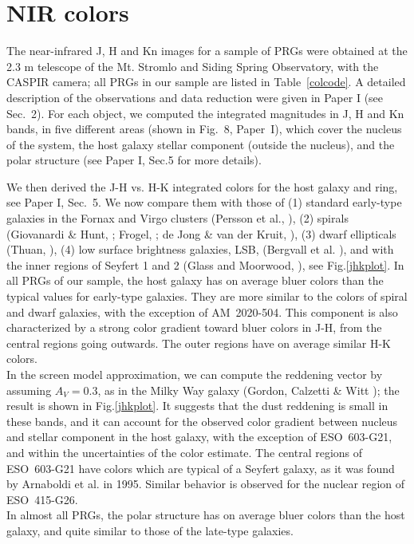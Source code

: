 \documentclass{aa}
\begin{document}
\section{NIR colors}\label{nircol}
The near-infrared J, H and Kn images for a sample of PRGs were obtained at
the 2.3 m telescope of the Mt. Stromlo and Siding Spring Observatory, with
the CASPIR camera; all PRGs in our sample are listed in Table~\ref{colcode}.
A detailed description of the observations and data reduction were given
in Paper I (see Sec.~2). For each object, we computed the
integrated magnitudes in J, H and Kn bands, in five different areas 
(shown in Fig.~8, Paper~I), which cover the nucleus of the system, 
the host galaxy stellar component (outside the nucleus), and the polar 
structure (see Paper I, Sec.5 for more details). 

We then derived the J-H vs. H-K integrated colors 
for the host galaxy and ring, see Paper I, Sec.~5.
We now compare them with those of (1) standard early-type galaxies in the
Fornax and Virgo clusters (Persson et al., \cite{Persson79}), (2) spirals
(Giovanardi \& Hunt, \cite{Giov96};
Frogel, \cite{Frog85}; de Jong \& van der Kruit, \cite{deJong94}), 
(3) dwarf ellipticals (Thuan, \cite{Thuan85}), (4) low surface brightness  
galaxies, LSB, (Bergvall et al. \cite{Berg99}), and with the inner regions
of Seyfert 1 and 2 (Glass and Moorwood, \cite{Glass85}), see Fig.\ref{jhkplot}.
In all PRGs of our sample, the host galaxy has on average bluer colors
than the typical values for early-type galaxies. They are more 
similar to the colors of spiral and dwarf galaxies, with the exception of 
AM~2020-504. This component is also characterized by a strong color
gradient toward bluer colors in J-H, from the central regions 
going outwards. The outer regions have on average similar H-K colors. \\
In the screen model approximation, we can compute
the reddening vector by assuming $A_{V}=0.3$, 
as in the Milky Way galaxy (Gordon, Calzetti \& Witt \cite{GCW97}); 
the result is shown in Fig.\ref{jhkplot}.
It suggests that the dust reddening is small in these bands, 
and it can account for the observed color gradient between nucleus and
stellar component in the host galaxy, with the exception of ESO~603-G21,
and within the uncertainties of the color estimate. 
The central regions of ESO~603-G21 have colors which are typical of a
Seyfert galaxy, as it was found by Arnaboldi et al. in
1995. Similar behavior is observed for the nuclear region of ESO~415-G26.\\
In almost all PRGs, the polar structure has on average bluer colors than 
the host galaxy, and quite similar to those of the late-type
galaxies.
\end{document}
